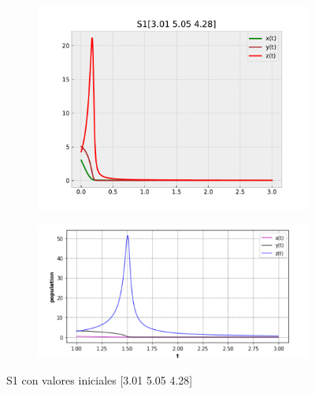 \documentclass{wscpaperproc}
\theoremstyle{wsc}
\begin{document}
\begin{figure}[h]
	\centering
	\begin{subfigure}[b]{0.5\textwidth}
		\centering
		\includegraphics[width=\textwidth]{Simulations/S1[3.01 5.05 4.28].pdf}
		\label{fig:grafica1}
	\end{subfigure}%
	\begin{subfigure}[b]{0.5\textwidth}
		\centering
		\includegraphics[width=\textwidth]{GraficasPaper/S1[1].png}
		\label{fig:grafica12}
	\end{subfigure}
	\caption{S1 con valores iniciales [3.01 5.05 4.28]}
	\label{fig:comparacion1}
\end{figure}
\end{document}

